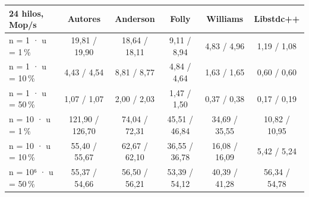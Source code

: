 \begin{tabularx}{\linewidth}{@{}p{24mm}CCCCC@{}}
\toprule
\textbf{24 hilos, Mop/s} & \textbf{Autores} & \textbf{Anderson} & \textbf{Folly} & \textbf{Williams} & \textbf{Libstdc++}\\
\midrule
n = 1 · u = 1\,\% & 19,81 / 19,90 & 18,64 / 18,11 & 9,11 / 8,94 & 4,83 / 4,96 & 1,19 / 1,08\\
n = 1 · u = 10\,\% & 4,43 / 4,54 & 8,81 / 8,77 & 4,84 / 4,64 & 1,63 / 1,65 & 0,60 / 0,60\\
n = 1 · u = 50\,\% & 1,07 / 1,07 & 2,00 / 2,03 & 1,47 / 1,50 & 0,37 / 0,38 & 0,17 / 0,19\\
n = 10 · u = 1\,\% & 121,90 / 126,70 & 74,04 / 72,31 & 45,51 / 46,84 & 34,69 / 35,55 & 10,82 / 10,95\\
n = 10 · u = 10\,\% & 55,40 / 55,67 & 62,67 / 62,10 & 36,55 / 36,78 & 16,08 / 16,09 & 5,42 / 5,24\\
n = 10⁶ · u = 50\,\% & 55,37 / 54,66 & 56,50 / 56,21 & 53,39 / 54,12 & 40,39 / 41,28 & 56,34 / 54,78\\
\bottomrule
\end{tabularx}
